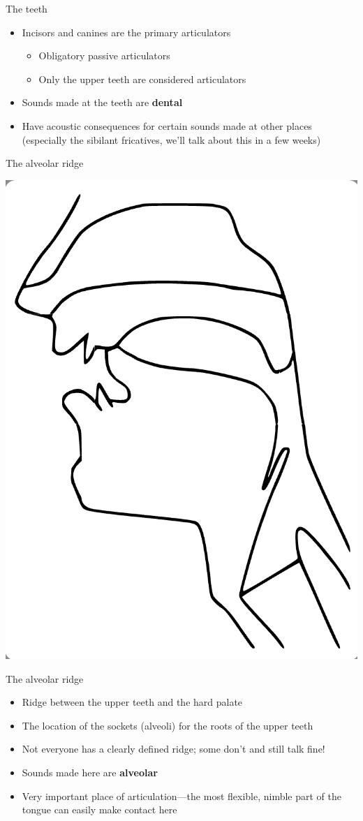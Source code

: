 \documentclass[professionalfonts]{beamer}
\begin{document}
\begin{frame}{The teeth}
    \begin{itemize}
        \item Incisors and canines are the primary articulators
        \begin{itemize}
            \item Obligatory passive articulators
            \item Only the upper teeth are considered articulators
        \end{itemize}
        \item Sounds made at the teeth are \textbf{dental}
            \item Have acoustic consequences for certain sounds made at other places (especially the sibilant fricatives, we'll talk about this in a few weeks)
    \end{itemize}
\end{frame}

\begin{frame}{The alveolar ridge}
    \begin{center}
        \includegraphics[width = .5\textwidth]{figs/Alveolars.png}
    \end{center}
\end{frame}

\begin{frame}{The alveolar ridge}
    \begin{itemize}
        \item Ridge between the upper teeth and the hard palate
        \item The location of the sockets (alveoli) for the roots of the upper teeth
        \item Not everyone has a clearly defined ridge; some don’t and still talk fine!
        \item Sounds made here are \textbf{alveolar}
        \item Very important place of articulation—the most flexible, nimble part of the tongue can easily make contact here
    \end{itemize}
\end{frame}
\end{document}
